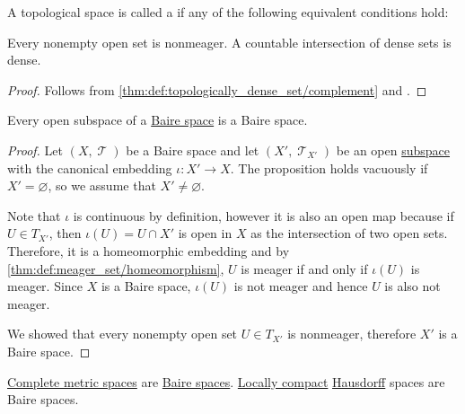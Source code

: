 \begin{definition}\label{def:baire_space}
  A topological space is called a  if any of the following equivalent conditions hold:
  \begin{thmenum}
     Every nonempty open set is nonmeager.
     A countable intersection of dense sets is dense.
  \end{thmenum}
\end{definition}
\begin{proof}
   Follows from \cref{thm:def:topologically_dense_set/complement} and .
\end{proof}

\begin{proposition}\label{thm:open_subspace_of_baire_space_is_baire}
  Every open subspace of a \hyperref[def:baire_space]{Baire space} is a Baire space.
\end{proposition}
\begin{proof}
  Let \( (X, \mscrT) \) be a Baire space and let \( (X', \mscrT_{X'}) \) be an open \hyperref[def:topological_subspace]{subspace} with the canonical embedding \( \iota: X' \to X \). The proposition holds vacuously if \( X' = \varnothing \), so we assume that \( X' \neq \varnothing \).

  Note that \( \iota \) is continuous by definition, however it is also an open map because if \( U \in T_{X'} \), then \( \iota(U) = U \cap X' \) is open in \( X \) as the intersection of two open sets. Therefore, it is a homeomorphic embedding and by \cref{thm:def:meager_set/homeomorphism}, \( U \) is meager if and only if \( \iota(U) \) is meager. Since \( X \) is a Baire space, \( \iota(U) \) is not meager and hence \( U \) is also not meager.

  We showed that every nonempty open set \( U \in T_{X'} \) is nonmeager, therefore \( X' \) is a Baire space.
\end{proof}

\begin{theorem}\label{thm:baire_category_theorem}
  \begin{thmenum}
     \hyperref[def:complete_metric_space]{Complete metric spaces} are \hyperref[def:baire_space]{Baire spaces}.
     \hyperref[def:locally_compact_space]{Locally compact} \hyperref[def:separation_axioms/T2]{Hausdorff} spaces are Baire spaces.
  \end{thmenum}
\end{theorem}
